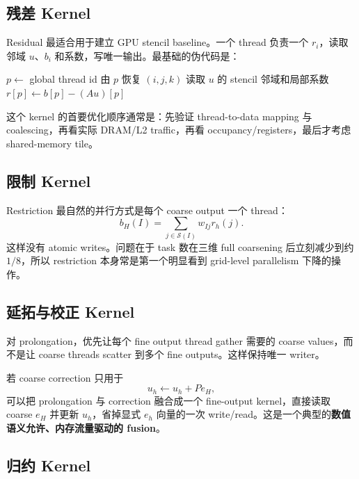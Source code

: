 \subsection{残差 Kernel}

Residual 最适合用于建立 GPU stencil baseline。一个 thread 负责一个 $r_i$，读取邻域 $u$、$b_i$ 和系数，写唯一输出。最基础的伪代码是：

\begin{algorithm}[htbp]
\caption{GPU one-thread-per-cell residual}
\begin{algorithmic}[1]
\State $p\gets$ global thread id
  \State 由 $p$ 恢复 $(i,j,k)$
  \State 读取 $u$ 的 stencil 邻域和局部系数
  \State $r[p]\gets b[p]-(Au)[p]$
\EndIf
\end{algorithmic}
\end{algorithm}

这个 kernel 的首要优化顺序通常是：先验证 thread-to-data mapping 与 coalescing，再看实际 DRAM/L2 traffic，再看 occupancy/registers，最后才考虑 shared-memory tile。

\subsection{限制 Kernel}

Restriction 最自然的并行方式是每个 coarse output 一个 thread：
\begin{equation}
b_H(I)=\sum_{j\in\mathcal S(I)}w_{Ij}r_h(j).
\end{equation}
这样没有 atomic writes。问题在于 task 数在三维 full coarsening 后立刻减少到约 $1/8$，所以 restriction 本身常是第一个明显看到 grid-level parallelism 下降的操作。

\subsection{延拓与校正 Kernel}

对 prolongation，优先让每个 fine output thread gather 需要的 coarse values，而不是让 coarse threads scatter 到多个 fine outputs。这样保持唯一 writer。

若 coarse correction 只用于
\[
u_h\leftarrow u_h+Pe_H,
\]
可以把 prolongation 与 correction 融合成一个 fine-output kernel，直接读取 coarse $e_H$ 并更新 $u_h$，省掉显式 $e_h$ 向量的一次 write/read。这是一个典型的\textbf{数值语义允许、内存流量驱动的 fusion}。

\subsection{归约 Kernel}

